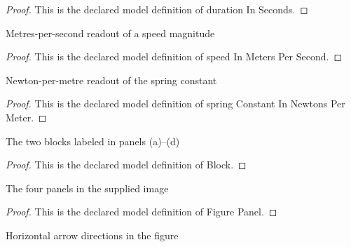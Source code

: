 \begin{proof}
  This is the declared model definition of duration In Seconds.
\end{proof}
\begin{definition}
  \label{def:physics:phyx-mini-0236:phyxminiproblems-problemphyxmini0236-speedinmeterspersecond}
  Metres-per-second readout of a speed magnitude
\end{definition}
\begin{proof}
  This is the declared model definition of speed In Meters Per Second.
\end{proof}
\begin{definition}
  \label{def:physics:phyx-mini-0236:phyxminiproblems-problemphyxmini0236-springconstantinnewtonspermeter}
  Newton-per-metre readout of the spring constant
\end{definition}
\begin{proof}
  This is the declared model definition of spring Constant In Newtons Per Meter.
\end{proof}
\begin{definition}[Block]
  \label{def:physics:phyx-mini-0236:phyxminiproblems-problemphyxmini0236-block}
  The two blocks labeled in panels (a)--(d)
\end{definition}
\begin{proof}
  This is the declared model definition of Block.
\end{proof}
\begin{definition}
  \label{def:physics:phyx-mini-0236:phyxminiproblems-problemphyxmini0236-figurepanel}
  The four panels in the supplied image
\end{definition}
\begin{proof}
  This is the declared model definition of Figure Panel.
\end{proof}
\begin{definition}
  \label{def:physics:phyx-mini-0236:phyxminiproblems-problemphyxmini0236-horizontaldirection}
  Horizontal arrow directions in the figure
\end{definition}
